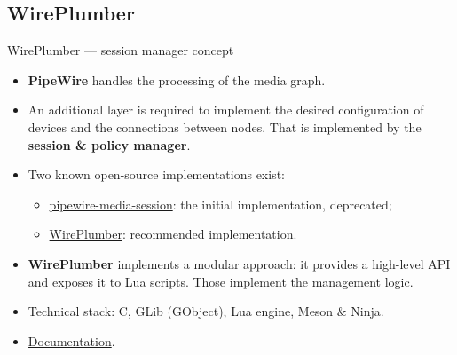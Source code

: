 \subsection{WirePlumber}



\begin{frame}{WirePlumber — session manager concept}
  \begin{itemize}

  \item \textbf{PipeWire} handles the processing of the media graph.

  \item An additional layer is required to implement the desired
    configuration of devices and the connections between nodes. That is
    implemented by the \textbf{session \& policy manager}.

  \item Two known open-source implementations exist:

    \begin{itemize}
    \item \href{https://gitlab.freedesktop.org/pipewire/media-session
      }{pipewire-media-session}: the initial implementation, deprecated;
    \item \href{https://pipewire.pages.freedesktop.org/wireplumber/
      }{WirePlumber}: recommended implementation.
    \end{itemize}

  \item \textbf{WirePlumber}
    implements a modular approach: it provides a high-level API and
    exposes it to \href{https://www.lua.org/}{Lua} scripts. Those
    implement the management logic.

  \item Technical stack: C, GLib (GObject), Lua engine, Meson \& Ninja.

  \item \href{https://pipewire.pages.freedesktop.org/wireplumber/}{Documentation}.

  \end{itemize}
\end{frame}



